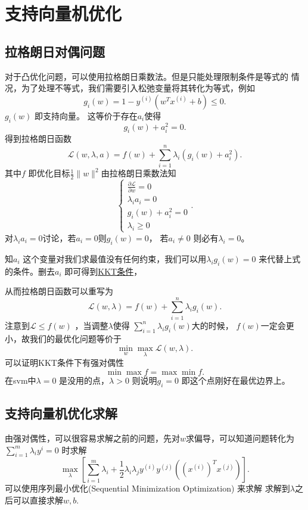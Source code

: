 \section{支持向量机优化} 
\subsection{拉格朗日对偶问题}
对于凸优化问题，可以使用拉格朗日乘数法。但是只能处理限制条件是等式的
情况，为了处理不等式，我们需要引入松弛变量将其转化为等式，例如
\[
		g_{i}\left( w \right)  = 1 - y^{(i)} \left( w^{T}x^{(i)} + b \right)  \le  0
.\] 
$g_{i}\left( w \right) $ 即支持向量。
这等价于存在$a_{i}$使得
\[
		g_{i}\left( w \right)  + a_{i}^2 = 0
.\] 
得到拉格朗日函数
\[
		\mathcal{L} \left( w,\lambda,a \right)  = 
		f\left( w \right)  + \sum_{i=1}^{n} \lambda_{i} \left( g_{i}\left( w \right) + 
		a_{i}^2 \right) 
.\] 
其中$f$ 即优化目标$\frac{1}{2} \|w\|^2 $由拉格朗日乘数法知
\[
\begin{cases}
		\frac{\partial \mathcal{L}}{\partial w} = 0 \\ 
		\lambda_{i} a_{i} = 0 \\
		g_{i} \left( w \right)  + a_{i} ^2 = 0 \\ 
		\lambda_{i} \ge 0
\end{cases}
.\] 
对$\lambda_{i}a_{i} = 0$讨论，若$a_{i}=0$则$g_{i}\left( w \right) =0$，
若$a_{i}\neq 0$ 则必有$\lambda_{i} = 0$。

知$a_{i}$ 这个变量对我们求最值没有任何约束，我们可以用$\lambda_{i}g_{i}\left( w \right) 
=0$ 来代替上式的条件。删去$a_{i}$ 即可得到\href{https://zhuanlan.zhihu.com/p/77750026}{KKT条件}，

从而拉格朗日函数可以重写为
\[
		\mathcal{L}\left( w,\lambda \right) = f(w) + \sum_{i=1}^{n} \lambda_{i}g_{i}\left( w \right) 
.\] 
注意到$\mathcal{L} \le  f\left( w \right) $ ，当调整$\lambda$使得
$\sum_{i=1}^{n} \lambda_{i}g_{i}\left( w \right) $大的时候，
$f\left( w \right) $一定会更小，故我们的最优化问题等价于
\[
		\min_{w} \max_{\lambda} \mathcal{L} \left( w, \lambda \right) 
.\] 
可以证明KKT条件下有强对偶性
\[
\min \max f = \max \min f
.\] 
在svm中$\lambda  = 0$ 是没用的点，$\lambda > 0$ 则说明$g_{i}=0$ 即这个点刚好在最优边界上。
\subsection{支持向量机优化求解} 
由强对偶性，可以很容易求解之前的问题，先对$w$求偏导，可以知道问题转化为
$
\sum_{i=1}^{m} \lambda_{i} y^{i} = 0
$
时求解
\[
\max_{\lambda} \left[ \sum_{i=1}^{m} \lambda_{i} + 
\frac{1}{2}\lambda_{i}\lambda_{j} y^{(i)} y^{(j)} \left( (x^{(i)})^{T}  x^{(j)} \right)    \right] 
.\] 
可以使用序列最小优化(Sequential Minimization Optimization) 来求解
求解到$\lambda$之后可以直接求解$w,b$. 

